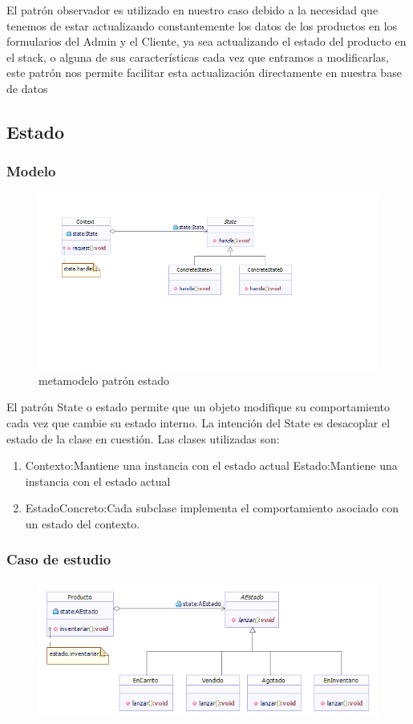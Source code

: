 El patrón observador es utilizado en nuestro caso debido a la necesidad que tenemos de estar actualizando constantemente los datos de los productos en los formularios del Admin y el Cliente, ya sea actualizando el estado del producto en el stack, o alguna de sus características cada vez que entramos a modificarlas, este patrón nos permite facilitar esta actualización directamente en nuestra base de datos
\newpage

\newpage

\subsection{Estado}
\subsubsection{Modelo}
\begin{figure}[th!]
	\centering
	\includegraphics[width=0.7\linewidth]{arquitectura/imagenes/PatronEstado}
	\caption{metamodelo patrón estado}
	\label{fig:metamodelo patron estado}
\end{figure}
El patrón State o estado permite que un objeto modifique su comportamiento cada vez que cambie su estado interno. La intención del State es desacoplar el estado de la clase en cuestión. Las clases utilizadas son:
\begin{enumerate}
	\item Contexto:Mantiene una instancia con el estado actual Estado:Mantiene una instancia con el estado actual
	\item EstadoConcreto:Cada subclase implementa el comportamiento asociado con un estado del contexto.
\end{enumerate}  

\subsubsection{Caso de estudio}
\begin{figure}[th!]
	\centering
	\includegraphics[width=0.7\linewidth]{arquitectura/imagenes/PatronEstadoCasoEstudio}
	\caption{}
	\label{fig:patronestadocasoestudio}
\end{figure}


